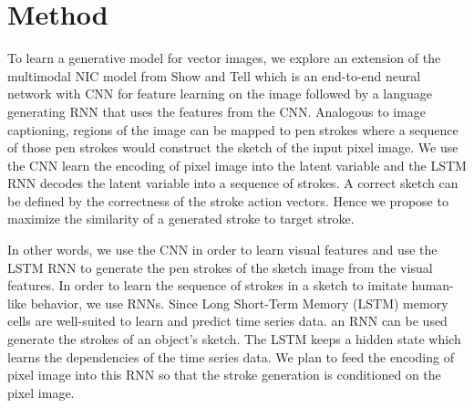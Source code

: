 \documentclass{article}
\begin{document}
\section{Method}

To learn a generative model for vector images, we explore an extension of the multimodal NIC model from Show and Tell \cite{DBLP:journals/corr/VinyalsTBE14} which is an end-to-end neural network with CNN for feature learning on the image followed by a language generating RNN that uses the features from the CNN. Analogous to image captioning, regions of the image can be mapped to pen strokes where a sequence of those pen strokes would construct the sketch of the input pixel image. We use the CNN learn the encoding of pixel image into the latent variable and the LSTM RNN decodes the latent variable into a sequence of strokes. A correct sketch can be defined by the correctness of the stroke action vectors. Hence we propose to maximize the similarity of a generated stroke to target stroke.

In other words, we use the CNN in order to learn visual features and use the LSTM RNN to generate the pen strokes of the sketch image from the visual features. In order to learn the sequence of strokes in a sketch to imitate human-like behavior, we use RNNs. Since Long Short-Term Memory (LSTM) \cite{LSTM} memory cells are well-suited to learn and predict time series data. an RNN can be used generate the strokes of an object's sketch. The LSTM keeps a hidden state which learns the dependencies of the time series data. We plan to feed the encoding of pixel image into this RNN so that the stroke generation is conditioned on the pixel image.

\end{document}
